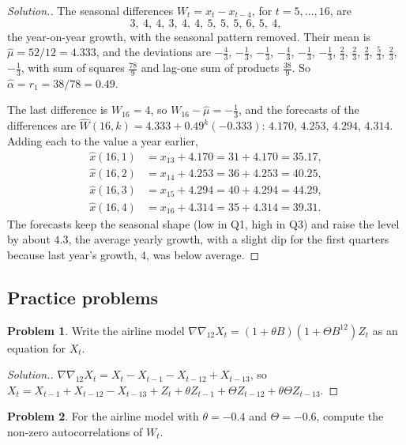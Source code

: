 \documentclass[11pt,a4paper]{article}
\theoremstyle{definition}
\newtheorem{problemx}{Problem}[subsection]
\newenvironment{problem}{\begin{problemx}}{\end{problemx}}
\newenvironment{solution}
  {\renewcommand{\qedsymbol}{}\begin{proof}[\textit{Solution}.]}
  {\end{proof}}
\begin{document}
\begin{solution}
The seasonal differences $W_t = x_t - x_{t-4}$, for $t = 5, \dots, 16$, are
\[
3, \ 4, \ 4, \ 3, \ 4, \ 4, \ 5, \ 5, \ 5, \ 6, \ 5, \ 4 ,
\]
the year-on-year growth, with the seasonal pattern removed. Their mean is $\hat\mu = 52/12 = 4.333$,
and the deviations are $-\frac43$, $-\frac13$, $-\frac13$, $-\frac43$, $-\frac13$, $-\frac13$, $\frac23$, $\frac23$, $\frac23$, $\frac53$, $\frac23$, $-\frac13$, with sum of squares $\frac{78}{9}$ and lag-one sum of products $\frac{38}9$. So
$\hat\alpha = r_1 = 38/78 = 0.49$.

The last difference is $W_{16} = 4$, so $W_{16} - \hat\mu = -\frac13$, and the forecasts of the differences are $\hat W(16, k) = 4.333 + 0.49^k(-0.333)$:
$4.170$, $4.253$, $4.294$, $4.314$. Adding each to the value a year earlier,
\begin{align*}
\hat x(16, 1) &= x_{13} + 4.170 = 31 + 4.170 = 35.17 , \\
\hat x(16, 2) &= x_{14} + 4.253 = 36 + 4.253 = 40.25 , \\
\hat x(16, 3) &= x_{15} + 4.294 = 40 + 4.294 = 44.29 , \\
\hat x(16, 4) &= x_{16} + 4.314 = 35 + 4.314 = 39.31 .
\end{align*}
The forecasts keep the seasonal shape (low in Q1, high in Q3) and raise the level by about $4.3$, the average yearly
growth, with a slight dip for the first quarters because last year's growth, $4$, was below average.
\end{solution}

\subsection{Practice problems}
\begin{problem}\label{prob:airline-eq}
Write the airline model $\nabla\nabla_{12}X_t = (1 + \theta B)(1 + \Theta B^{12})Z_t$ as an equation for $X_t$.
\end{problem}

\begin{solution}
$\nabla\nabla_{12}X_t = X_t - X_{t-1} - X_{t-12} + X_{t-13}$, so
$X_t = X_{t-1} + X_{t-12} - X_{t-13} + Z_t + \theta Z_{t-1} + \Theta Z_{t-12} + \theta\Theta Z_{t-13}$.
\end{solution}

\begin{problem}\label{prob:airline-acf}
For the airline model with $\theta = -0.4$ and $\Theta = -0.6$, compute the non-zero autocorrelations of $W_t$.
\end{problem}
\end{document}

